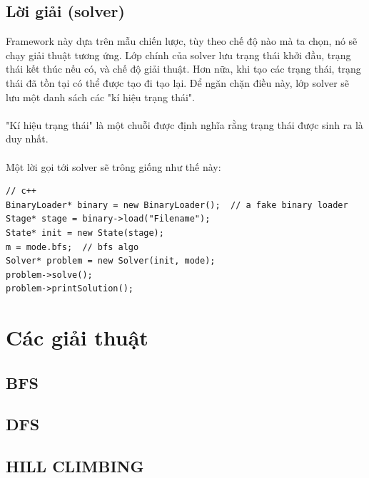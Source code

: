 \documentclass[a4paper, 11pt]{article}
\begin{document}
\subsection{Lời giải (solver)}
Framework này dựa trên mẫu chiến lược, tùy theo chế độ nào mà ta chọn, nó sẽ chạy giải thuật tương ứng. 
Lớp chính của solver lưu trạng thái khởi đầu, trạng thái kết thúc nếu có, và chế độ giải thuật. Hơn nữa, 
khi tạo các trạng thái, trạng thái đã tồn tại có thể được tạo đi tạo lại. Để ngăn chặn điều này, lớp solver 
sẽ lưu một danh sách các "kí hiệu trạng thái".\\~\\
"Kí hiệu trạng thái" là một chuỗi được định nghĩa rằng trạng thái được sinh ra là duy nhất.\\~\\
Một lời gọi tới solver sẽ trông giống như thế này:
\begin{verbatim}
// c++
BinaryLoader* binary = new BinaryLoader();  // a fake binary loader
Stage* stage = binary->load("Filename");
State* init = new State(stage);
m = mode.bfs;  // bfs algo
Solver* problem = new Solver(init, mode);
problem->solve();
problem->printSolution();
\end{verbatim}
\section{Các giải thuật}
\subsection{BFS}
\subsection{DFS}
\subsection{HILL CLIMBING}
\end{document}
